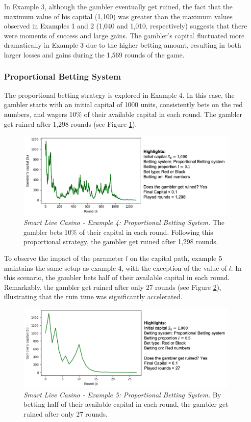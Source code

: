 \documentclass[11pt,twoside]{article}
\numberwithin{Theorem}{section}
\numberwithin{Definition}{section}
\numberwithin{Lemma}{section}
\numberwithin{Algorithm}{section}
\numberwithin{equation}{section}
\begin{document}
In Example 3, although the gambler eventually get ruined, the fact that the maximum value of his capital (1,100) was greater than the maximum values observed in Examples 1 and 2 (1,040 and 1,010, respectively) suggests that there were moments of success and large gains. The gambler's capital fluctuated more dramatically in Example 3 due to the higher betting amount, resulting in both larger losses and gains during the 1,569 rounds of the game.

\subsubsection{Proportional Betting System}
The proportional betting strategy is explored in Example 4. In this case, the gambler starts with an initial capital of 1000 units, consistently bets on the red numbers, and wagers 10\% of their available capital in each round. The gambler get ruined after 1,298 rounds (see Figure \ref{sim_live_p_1}).

\begin{figure}[H]
    \centering
    \includegraphics[width=11cm]{data_prop_1.png}
    \caption[Smart Live Casino - Example 4: Proportional Betting System]{\textit{Smart Live Casino - Example 4: Proportional Betting System.} The gambler bets 10\% of their capital in each round. Following this proportional strategy, the gambler get ruined after 1,298 rounds.}\label{sim_live_p_1}
\end{figure}

To observe the impact of the parameter $l$ on the capital path, example 5 maintains the same setup as example 4, with the exception of the value of $l$. In this scenario, the gambler bets half of their available capital in each round. Remarkably, the gambler get ruined after only 27 rounds (see Figure \ref{sim_live_p_2}), illustrating that the ruin time was significantly accelerated.

\begin{figure}[H]
    \centering
    \includegraphics[width=11cm]{data_prop_2.png}
    \caption[Smart Live Casino - Example 5: Proportional Betting System]{\textit{Smart Live Casino - Example 5: Proportional Betting System.} By betting half of their available capital in each round, the gambler get ruined after only 27 rounds.}\label{sim_live_p_2}
\end{figure}
\end{document}
